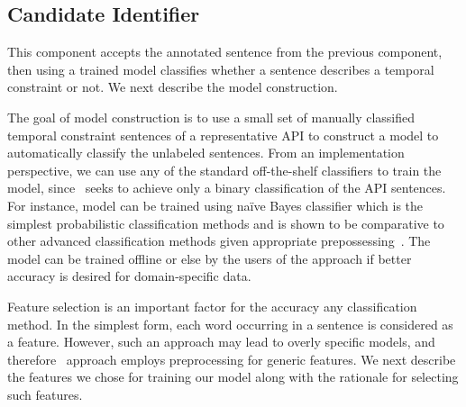 \subsection{Candidate Identifier}

This component accepts the annotated sentence from the previous component,
then using a trained model classifies whether a sentence describes a temporal constraint or not. We next describe the model construction.

The goal of model construction is to use a small set of manually classified temporal constraint sentences of a representative API to construct a model to automatically classify the unlabeled sentences. 
From an implementation perspective, we can use any of the standard off-the-shelf classifiers to train the model, since \tool\ seeks to achieve only a binary classification of the API sentences.
For instance, model can be trained using na{\"i}ve Bayes classifier which is the simplest probabilistic classification methods and is shown to be comparative to other advanced classification methods given appropriate prepossessing~\cite{rennie2003tackling}.
The model can be trained offline or else by the users of the approach if better accuracy is desired for domain-specific data.

Feature selection is an important factor for the accuracy any classification method.
In the simplest form, each word occurring in a sentence is considered as a feature. However, such an approach may lead to overly specific models, and therefore \tool\ approach employs preprocessing for generic features. We next describe the features we chose for training our model along with the rationale for selecting such features.


